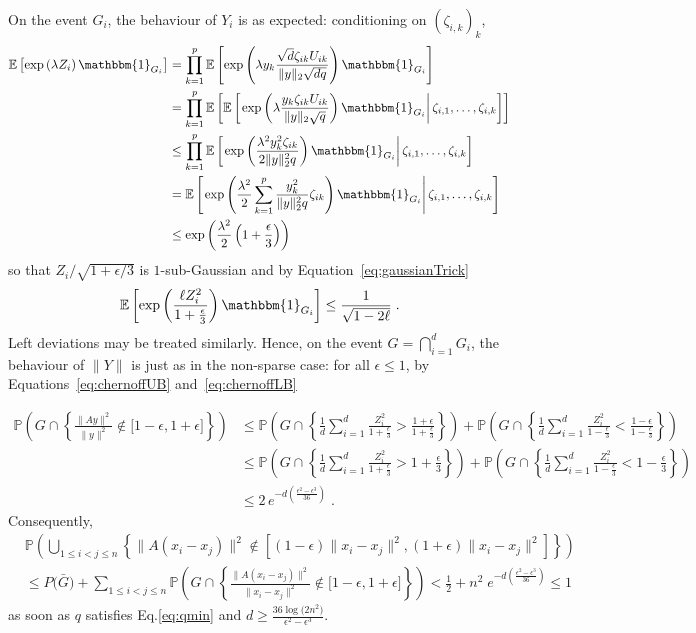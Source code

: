 \documentclass{ps}
\renewcommand{\P}{\mathbb{P}}
\newcommand{\E}{\mathbb{E}}
\newcommand{\1}{\mathbbm{1}}
\theoremstyle{plain}
\begin{document}
On the event $G_i$, the behaviour of $Y_i$ is as expected: conditioning on $(\zeta_{i,k})_k$,
\begin{align*}
\E\left[\exp\left(\lambda Z_i\right) \1_{G_i}\right]&= \prod_{k=1}^p \E\left[\exp\left(\lambda y_k\frac{\sqrt{d} \zeta_{ik}U_{ik}}{\|y\|_2\sqrt{dq}}\right) \1_{G_i}\right]\\
& =\prod_{k=1}^p  \E\left[  \E\left[ \left. \exp\left(\lambda \frac{y_k\zeta_{ik}U_{ik}}{\|y\|_2\sqrt{q}}\right) \1_{G_i}  \right| \zeta_{i,1},\dots,\zeta_{i,k}\right]\right]\\
& \leq \prod_{k=1}^p  \E\left[  \left. \exp\left( \frac{\lambda^2y_k^2\zeta_{ik}}{2\|y\|_2^2q}\right) \1_{G_i}  \right| \zeta_{i,1},\dots,\zeta_{i,k}\right]\\
& = \E\left[  \left. \exp\left( \frac{\lambda^2}{2}\sum_{k=1}^p \frac{y_k^2}{\|y\|_2^2q}\zeta_{ik}\right) \1_{G_i}  \right| \zeta_{i,1},\dots,\zeta_{i,k}\right]\\
&\leq \exp\left( \frac{\lambda^2}{2}\left(1+\frac{\epsilon}{3}\right)\right)
\end{align*}
so that $Z_i/\sqrt{1+\epsilon/3}$ is $1$-sub-Gaussian and by Equation~\eqref{eq:gaussianTrick}
\[\E\left[\exp\left(\frac{\ell Z_i^2}{1+\frac{\epsilon}{3}}\right) \1_{G_i}\right] \leq  \frac{1}{\sqrt{1-2\ell}}\;. \]
Left deviations may be treated similarly. Hence, on the event $G=\bigcap_{i=1}^d G_i$, the behaviour of $\|Y\|$ is just as in the non-sparse case: for all $\epsilon\leq 1$, by Equations~\eqref{eq:chernoffUB} and~\eqref{eq:chernoffLB}

\begin{align*} 
\P\left( G\cap \left\{\frac{\|Ay\|^2}{\|y\|^2} \notin \big[1-\epsilon, 1+\epsilon\big] \right\} \right)
&\leq \P\left( G \cap \left\{\frac{1}{d} \sum_{i=1}^d \frac{Z_i^2}{1+\frac{\epsilon}{3}} >  \frac{1+\epsilon}{1+\frac{\epsilon}{3}} \right\} \right) + \P\left(  G \cap \left\{\frac{1}{d} \sum_{i=1}^d \frac{Z_i^2}{1-\frac{\epsilon}{3}}  < \frac{1-\epsilon}{1-\frac{\epsilon}{3}} \right\} \right)\\
&\leq \P\left( G \cap \left\{\frac{1}{d} \sum_{i=1}^d \frac{Z_i^2}{1+\frac{\epsilon}{3}} > 1+\frac{\epsilon}{3} \right\} \right) + \P\left(  G \cap \left\{\frac{1}{d} \sum_{i=1}^d \frac{Z_i^2}{1-\frac{\epsilon}{3}}  < 1-\frac{\epsilon}{3} \right\} \right)\\
&\leq 2\,
e^{-d\left(\frac{\epsilon^2 - \epsilon^3}{36} \right)} \;.
\end{align*}
Consequently,
\begin{align*}
   & \P\left( \bigcup_{1\leq i<j\leq n} \left\{ \big\|A(x_i-x_j)\big\|^2 \notin \left[ (1-\epsilon)\|x_i-x_j\|^2  ,  (1+\epsilon)\|x_i-x_j\|^2  \right] \right\}  \right) 
\\ & \leq  P\big(\bar{G}\big) + \sum_{1\leq i<j\leq n }  \P\left( G\cap \left\{\frac{\|A(x_i-x_j)\|^2}{\|x_i-x_j\|^2} \notin \big[1-\epsilon, 1+\epsilon\big] \right\} \right)
<  \frac{1}{2}+ n^2 \;e^{-d\left(\frac{\epsilon^2 - \epsilon^3}{36} \right)}  \leq 1
\end{align*}
as soon as $q$ satisfies Eq.\eqref{eq:qmin} and $d\geq \frac{36\log\big(2n^2\big)}{\epsilon^2-\epsilon^3}$.
\end{document}
